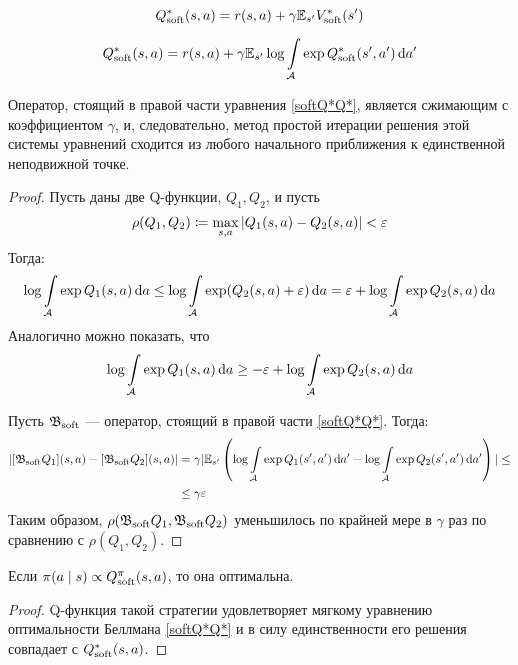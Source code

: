 \begin{proposition}
$$Q^*_{\mathrm{soft}}(s, a) = r(s, a) + \gamma \mathbb{E}_{s'} V^*_{\mathrm{soft}}(s')$$
\end{proposition}

\begin{proposition}
\begin{equation}\label{softQ*Q*}
Q^*_{\mathrm{soft}}(s, a) = r(s, a) + \gamma \mathbb{E}_{s'} \log \int\limits_{\mathcal{A}} \exp Q^*_{\mathrm{soft}}(s', a') \mathop{}\!\mathrm{d} a'
\end{equation}
\end{proposition}

\begin{theorem}
Оператор, стоящий в правой части уравнения \eqref{softQ*Q*}, является сжимающим с коэффициентом $\gamma$, и, следовательно, метод простой итерации решения этой системы уравнений сходится из любого начального приближения к единственной неподвижной точке.
\begin{proof}
Пусть даны две Q-функции, $Q_1, Q_2$, и пусть 
$$\rho(Q_1, Q_2) \coloneqq \max\limits_{s, a} | Q_1(s, a) \HM- Q_2(s, a) | \HM< \eps$$
Тогда:
$$
\log \int\limits_{\mathcal{A}} \exp Q_1(s, a) \mathop{}\!\mathrm{d} a \le \log \int\limits_{\mathcal{A}} \exp (Q_2(s, a) + \varepsilon) \mathop{}\!\mathrm{d} a = \varepsilon + \log \int\limits_{\mathcal{A}} \exp Q_2(s, a) \mathop{}\!\mathrm{d} a
$$
Аналогично можно показать, что 
$$
\log \int\limits_{\mathcal{A}} \exp Q_1(s, a) \mathop{}\!\mathrm{d} a \ge -\varepsilon + \log \int\limits_{\mathcal{A}} \exp Q_2(s, a) \mathop{}\!\mathrm{d} a
$$

Пусть $\mathfrak{B}_{\mathrm{soft}}$ --- оператор, стоящий в правой части \eqref{softQ*Q*}. Тогда:
\begin{align*}
| [\mathfrak{B}_{\mathrm{soft}} Q_1](s, a) - [\mathfrak{B}_{\mathrm{soft}} Q_2](s, a) | &= \gamma | \mathbb{E}_{s'} \left( \log \int\limits_{\mathcal{A}} \exp Q_1(s', a') \mathop{}\!\mathrm{d} a' - \log \int\limits_{\mathcal{A}} \exp Q_2(s', a') \mathop{}\!\mathrm{d} a' \right) | \le \\ 
&\le \gamma \varepsilon
\end{align*}
Таким образом, $\rho(\mathfrak{B}_{\mathrm{soft}} Q_1, \mathfrak{B}_{\mathrm{soft}} Q_2)$ уменьшилось по крайней мере в $\gamma$ раз по сравнению с $\rho(Q_1, Q_2)$.
\end{proof}
\end{theorem}

\begin{proposition}
Если $\pi(a \mid s) \propto Q^{\pi}_{\mathrm{soft}}(s, a)$, то она оптимальна.
\begin{proof}
Q-функция такой стратегии удовлетворяет мягкому уравнению оптимальности Беллмана \eqref{softQ*Q*} и в силу единственности его решения совпадает с $Q^*_{\mathrm{soft}}(s, a)$.
\end{proof}
\end{proposition}

